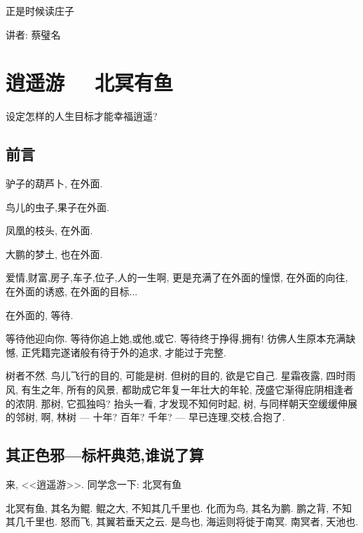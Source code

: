 \documentclass[11pt]{article}
\begin{document}
\kaishu 
	
\setcounter{section}{0}


\begin{center}
	
	{\Large \kaishu 正是时候读庄子 }
	
	{\kaishu 讲者: 蔡璧名} 
		
\end{center}

\vspace{-0.75cm}

\section{\kaishu 逍遥游 \ \ 北冥有鱼}

设定怎样的人生目标才能幸福逍遥?

\setcounter{subsection}{-1}

\subsection{\kaishu 前言}

\vspace{-0.5cm}

驴子的葫芦卜, 在外面.

鸟儿的虫子,果子在外面.

凤凰的枝头, 在外面.

大鹏的梦土, 也在外面.

爱情,财富,房子,车子,位子,人的一生啊, 更是充满了在外面的憧憬, 在外面的向往, 在外面的诱惑, 在外面的目标...

在外面的, 等待.

等待他迎向你. 等待你追上她,或他,或它. 等待终于挣得,拥有! 彷佛人生原本充满缺憾, 正凭籍完遂诸般有待于外的追求, 才能过于完整.

树者不然. 鸟儿飞行的目的, 可能是树. 但树的目的, 欲是它自己. 星霜夜露, 四时雨风, 有生之年, 所有的风景, 都助成它年复一年壮大的年轮, 茂盛它渐得庇阴相逢者的浓阴. 那树, 它孤独吗? 抬头一看, 才发现不知何时起, 树, 与同样朝天空缓缓伸展的邻树, 啊, 林树 --- 十年? 百年? 千年?  --- 早已连理,交枝,合抱了. 

\subsection{\kaishu 其正色邪---标杆典范,谁说了算}

来, <<逍遥游>>. 同学念一下: {\color{blue} 北冥有鱼}

{\color{blue}  北冥有鱼, 其名为鲲. 鲲之大, 不知其几千里也. 化而为鸟, 其名为鹏. 鹏之背, 不知其几千里也. 怒而飞, 其翼若垂天之云. 是鸟也, 海运则将徙于南冥. 南冥者, 天池也.}
\end{document}
